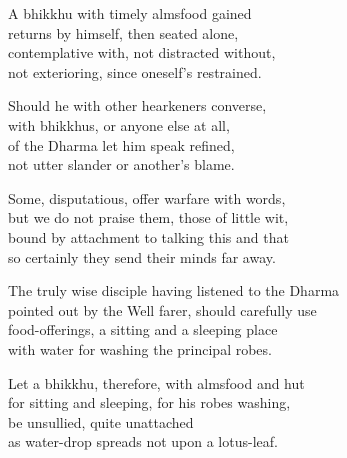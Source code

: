\begin{MyDescription}{}
A bhikkhu with timely almsfood gained\\
returns by himself, then seated alone,\\
contemplative with, not distracted without,\\
not exterioring, since oneself's restrained.
\end{MyDescription}

\begin{MyDescription}{}
Should he with other hearkeners converse,\\
with bhikkhus, or anyone else at all,\\
of the Dharma let him speak refined,\\
not utter slander or another's blame.
\end{MyDescription}

\begin{MyDescription}{}
Some, disputatious, offer warfare with words,\\
but we do not praise them, those of little wit,\\
bound by attachment to talking this and that\\
so certainly they send their minds far away.

\end{MyDescription}

\begin{MyDescription}{}
The truly wise disciple having listened to the Dharma\\
pointed out by the Well farer, should carefully use\\
food-offerings, a sitting and a sleeping place\\
with water for washing the principal robes.

\end{MyDescription}

\begin{MyDescription}{}
Let a bhikkhu, therefore, with almsfood and hut\\
for sitting and sleeping, for his robes washing,\\
be unsullied, quite unattached\\
as water-drop spreads not upon a lotus-leaf.
\end{MyDescription}

